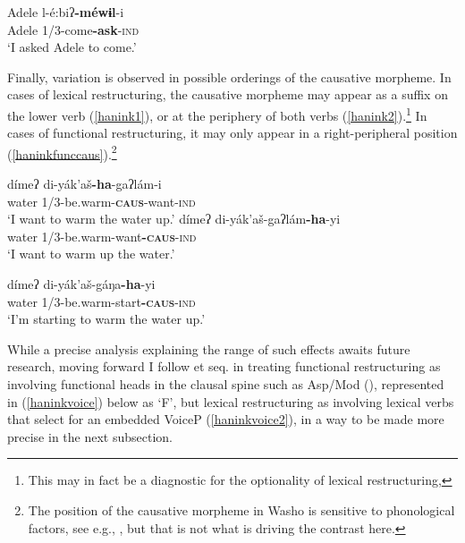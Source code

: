 \documentclass[output=paper]{langscibook}
\begin{document}
\ea
\gll Adele l-é:biʔ{\bfseries -méwɨl}-i\\
Adele 1/3-come{\bfseries -ask}-{\scshape ind}\\
\glt `I asked Adele to come.' \label{haninkobjectcontrol}
\z 


Finally, variation is observed in possible orderings of the causative morpheme. In cases of lexical restructuring, the causative morpheme may appear as a suffix on the lower verb (\ref{hanink1}), or at the periphery of both verbs (\ref{hanink2}).\footnote{This may in fact be a diagnostic for the optionality of lexical restructuring, } In cases of functional restructuring, it may only appear in a right-peripheral position (\ref{haninkfunccaus}).\footnote{The position of the causative morpheme in Washo is sensitive to phonological factors, see e.g.,  \citealt{jacobsen1973,benz2018}, but that is not what is driving the contrast here.} 

\ea \gll dímeʔ di-yák'aš{\bf-ha}-gaʔlám-i\\
water 1/3-be.warm-\textbf{\textsc{caus}}-want{\scshape-ind}\\
\glt `I want to warm the water up.' \label{hanink1}
\ex \gll dímeʔ di-yák'aš-gaʔlám{\bfseries -ha}-yi\\
water 1/3-be.warm-want\textbf{\textsc{-caus}}{\scshape-ind}\\
\glt `I want to warm up the water.' \label{hanink2}
\z
\z

\label{haninkfunccaus}
\ea \gll dímeʔ di-yák'aš-gáŋa{\bf-ha}-yi\\
water 1/3-be.warm-start\textbf{\textsc{-caus}}{\scshape-ind}\\
\glt `I'm starting to warm the water up.' \label{hanink3}
\z
\z



While a precise analysis explaining the range of such effects awaits future research, moving forward I follow \citealt{wurmbrand2001} et seq. in treating functional restructuring as involving functional heads in the clausal spine such as Asp/Mod (\citealt{cinque2001,cinque2004,grano2012diss}), represented in (\ref{haninkvoice}) below as `F', but lexical restructuring as involving lexical verbs that select for an embedded VoiceP (\ref{haninkvoice2}), in a way to be made more precise in the next subsection.
\end{document}
